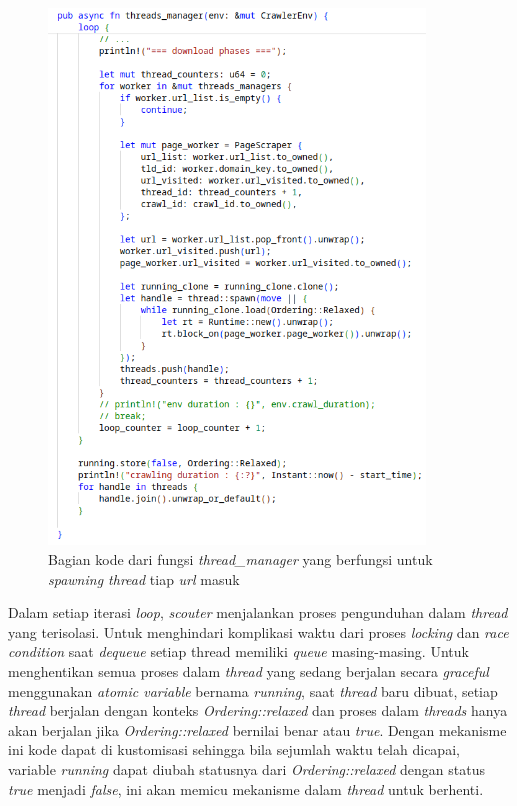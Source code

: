\begin{figure}[H]
  \centering
  \includegraphics[keepaspectratio, width=10cm]{gambar/thread_manager_spawn_code.png}
  \caption{Bagian kode dari fungsi \emph{thread\_manager} yang berfungsi untuk \emph{spawning thread} tiap \emph{url} masuk}
  \label{gambar:thread-manager-spawn-code}
\end{figure}

Dalam setiap iterasi \emph{loop}, \emph{scouter} menjalankan proses pengunduhan dalam \emph{thread} yang terisolasi. Untuk menghindari komplikasi waktu dari proses \emph{locking} dan \emph{race condition} saat \emph{dequeue} setiap thread memiliki \emph{queue} masing-masing. Untuk menghentikan semua proses dalam \emph{thread} yang sedang berjalan secara \emph{graceful} menggunakan \emph{atomic variable} bernama \emph{running}, saat \emph{thread} baru dibuat, setiap \emph{thread} berjalan dengan konteks \emph{Ordering::relaxed} dan proses dalam \emph{threads} hanya akan berjalan jika \emph{Ordering::relaxed} bernilai benar atau \emph{true}. Dengan mekanisme ini kode dapat di kustomisasi sehingga bila sejumlah waktu telah dicapai, variable \emph{running} dapat diubah statusnya dari \emph{Ordering::relaxed} dengan status \emph{true} menjadi \emph{false}, ini akan memicu mekanisme dalam \emph{thread} untuk berhenti.

